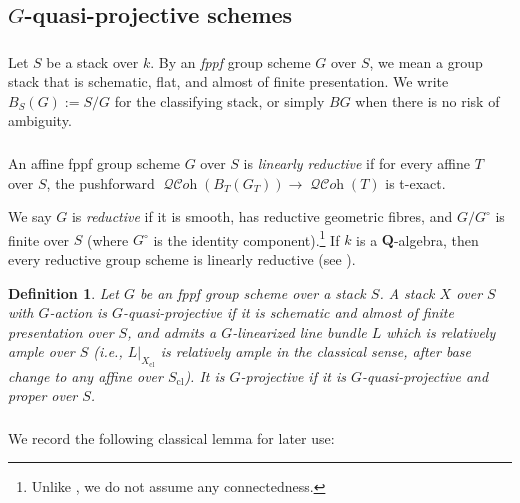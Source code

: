 \documentclass[12pt, oneside]{amsart}
\numberwithin{equation}{section}
\newtheorem{definition}[subsubsection]{Definition}
\theoremstyle{remark}
\theoremstyle{plain}
\DeclareMathOperator{\QCOH}{\mathcal{QC}\textit{oh}}
\newcommand{\bQ}{\mathbf{Q}}
\newcommand{\cl}{{\operatorname{cl}}}
\begin{document}
\subsection{$G$-quasi-projective schemes}

\subsubsection{}\label{sssec:fppf}

Let $S$ be a stack over $k$.
By an \emph{fppf} group scheme $G$ over $S$, we mean a group stack that is schematic, flat, and almost of finite presentation.
We write $B_S(G) := S/G$ for the classifying stack, or simply $BG$ when there is no risk of ambiguity.

\subsubsection{}

An affine fppf group scheme $G$ over $S$ is \emph{linearly reductive} if for every affine $T$ over $S$, the pushforward $\QCOH(B_T(G_T)) \to \QCOH(T)$ is t-exact.

We say $G$ is \emph{reductive} if it is smooth, has reductive geometric fibres, and $G/G^\circ$ is finite over $S$ (where $G^\circ$ is the identity component).\footnote{%
  Unlike \cite[Exp.~XIX]{SGA3}, we do not assume any connectedness.
}
If $k$ is a $\bQ$-algebra, then every reductive group scheme is linearly reductive (see \cite[Thm.~9.7.6, Rem.~9.1.3]{AlperAdequate}).

\begin{definition}
  Let $G$ be an fppf group scheme over a stack $S$.
  A stack $X$ over $S$ with $G$-action is \emph{$G$-quasi-projective} if it is schematic and almost of finite presentation over $S$, and admits a $G$-linearized line bundle $L$ which is relatively ample over $S$ (i.e., $L|_{X_\cl}$ is relatively ample in the classical sense, after base change to any affine over $S_\cl$).
  It is \emph{$G$-projective} if it is $G$-quasi-projective and proper over $S$.
\end{definition}

\subsubsection{}

We record the following classical lemma for later use:
\end{document}
